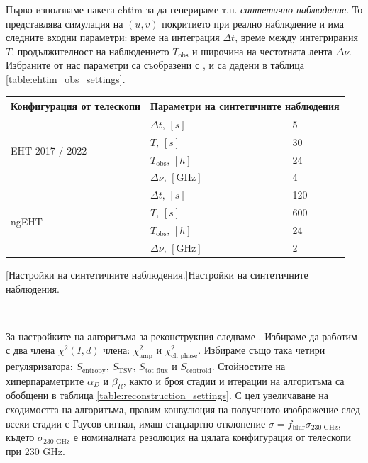 \documentclass[12pt]{article}
\numberwithin{equation}{section}
\numberwithin{figure}{section}
\begin{document}
	Първо използваме пакета ehtim за да генерираме т.н. \emph{синтетично наблюдение}. То представлява симулация на $(u,v)$ покритието при реално наблюдение и има следните входни параметри: време на интеграция $\Delta t$, време между интегрирания $T$, продължителност на наблюдението $T_\text{obs}$ и широчина на честотната лента $\Delta\nu$. Избраните от нас параметри са съобразени с \cite{EHTIM}, и са дадени в таблица \ref{table:ehtim_obs_settings}.\\ 
	\begin{minipage}{18em}
		\begin{center}
			\begin{tabular}{|| m{7.5em} | m{5em} | m{2em} ||}
				\hline 
				Конфигурация от телескопи & \multicolumn{2}{m{7em}||}{Параметри на синтетичните наблюдения} \\
				\hline
				\multirow{4}{7.5em}{\centering \small EHT 2017 / 2022} &\centering $\Delta t,\, [s]$    		& 5   \\ 
				&\centering $T,\,[s]$ 		     		& 30  \\ 
				&\centering $T_\text{obs},\,[h]$ 		& 24  \\
				&\centering $\Delta \nu,\,[\text{GHz}]$ & 4 \\
				\hline
				\multirow{4}{7.5em}{\centering \small ngEHT} 		  & \centering $\Delta t,\, [s]$    	   & 120 \\ 
				& \centering $T,\,[s]$ 		      	   & 600 \\ 
				& \centering $T_\text{obs},\,[h]$ 	   & 24  \\
				& \centering $\Delta \nu,\,[\text{GHz}]$ & 2 \\
				\hline
			\end{tabular}
		\end{center}
		[Настройки на синтетичните наблюдения.]{Настройки на синтетичните наблюдения.}
		\label{table:ehtim_obs_settings}
	\end{minipage}\,\,
	\begin{minipage}{18em}
		За настройките на алгоритъма за реконструкция следваме \cite{EHTIM}. Избираме да работим с два члена $\chi^2(I,d)$ члена: $\chi^2_\text{amp}$ и $\chi^2_\text{cl. phase}$. Избираме също така четири регуляризатора: $S_\text{entropy}$, $S_\text{TSV}$, $S_\text{tot flux}$ и $S_\text{centroid}$. Стойностите на хиперпараметрите $\alpha_D$ и $\beta_R$, както и броя стадии и итерации на алгоритъма са обобщени в таблица \ref{table:reconstruction_settings}. С цел увеличаване на сходимостта на алгоритъма, правим конвулюция на полученото изображение след всеки стадии с Гаусов сигнал, имащ стандартно отклонение $\sigma = f_\text{blur} \sigma_{\text{230 GHz}}$, където $\sigma_{\text{230 GHz}}$ е номиналната резолюция на цялата конфигурация от телескопи при 230 GHz.
	\end{minipage}
	
\end{document}
